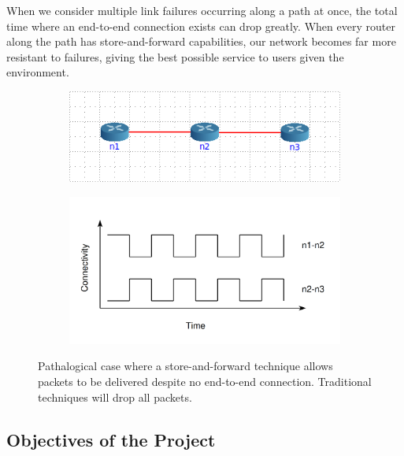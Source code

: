\documentclass[10pt,twoside,a4paper]{article}
\begin{document}
When we consider multiple link failures occurring along a path at once, the total time where an end-to-end connection exists can drop greatly. When every router along the path has store-and-forward capabilities, our network becomes far more resistant to failures, giving the best possible service to users given the environment.

\begin{figure}[H]
\centering
\begin{subfigure}{.45\textwidth}
  \centering
  \includegraphics[width=1\linewidth]{pathalogical_topology}
  \label{fig:pathalogical_topology}
\end{subfigure}%
\begin{subfigure}{.55\textwidth}
  \centering
  \includegraphics[width=1\linewidth]{pathalogical_graph}
  \label{fig:pathalogical_graph}
\end{subfigure}
\caption{Pathalogical case where a store-and-forward technique allows packets to be delivered despite no end-to-end connection. Traditional techniques will drop all packets.}
\label{fig:pathalogical}
\end{figure}

\subsection{Objectives of the Project}
\end{document}
